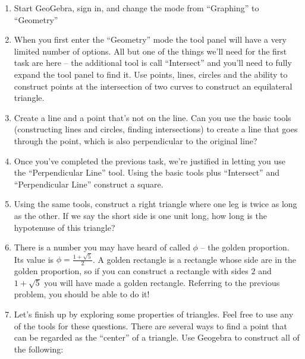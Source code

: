 \begin{enumerate}

\item Start GeoGebra, sign in, and change the mode from ``Graphing'' to ``Geometry''

\vfill

\item When you first enter the ``Geometry'' mode the tool panel will have a very limited number of options.  All but one of the things we'll need for the first task are here -- the additional tool is call ``Intersect'' and you'll need to fully expand the tool panel to find it.  Use points, lines, circles and the ability to construct points at the intersection of two curves to construct an equilateral triangle.

\vfill

\item Create a line and a point that's not on the line.  Can you use the basic tools (constructing lines and circles, finding intersections) to create a line that goes through the point, which is also perpendicular to the original line?

\vfill

\item Once you've completed the previous task, we're justified in letting you use the ``Perpendicular Line'' tool.  Using the basic tools plus ``Intersect'' and ``Perpendicular Line'' construct a square.

\vfill

\item Using the same tools, construct a right triangle where one leg is twice as long as the other.  If we say the short side is one unit long, how long is the hypotenuse of this triangle?

\vfill

\item There is a number you may have heard of called $\phi$ -- the golden proportion.  Its value is $\displaystyle \phi = \frac{1+\sqrt{5}}{2}$.
A golden rectangle is a rectangle whose side are in the golden proportion, so if you can construct a rectangle with sides $2$ and $1+\sqrt{5}$ you will have made a golden rectangle.  Referring to the previous problem, you should be able to do it!

\vfill

\item Let's finish up by exploring some properties of triangles.  Feel free to use any of the tools for these questions.
There are several ways to find a point that can be regarded as the ``center'' of a triangle.  Use Geogebra to construct all of the following:


\end{enumerate}

